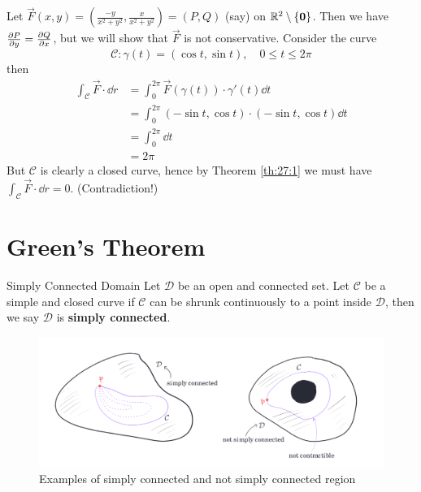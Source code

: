 \documentclass[../Analysis-3]{subfiles}
\begin{document}
\begin{Eg}{}{}
    Let $\vec{F}(x,y) = \left( \frac{-y}{x^2+y^2}, \frac{x}{x^2+y^2} \right) = (P,Q)$ (say) on $\mathbb{R}^2 \setminus \{\mathbf{0}\}$. Then we have $\pdv{P}{y} = \pdv{Q}{x}$, but we will show that $\vec{F}$ is not conservative. Consider the curve
    \[
        \mathcal{C} : \gamma(t) = ( \cos t, \sin t), \quad 0 \leq t \leq 2\pi
    \]
    then
    \begin{align*}
        \int_{\mathcal{C}} \vec{F} \cdot \dd r & = \int_0^{2\pi}  \vec{F}(\gamma(t))\cdot \gamma'(t)  \dd t       \\
                                               & = \int_0^{2\pi}  (-\sin t, \cos t) \cdot (-\sin t, \cos t) \dd t \\
                                               & = \int_0^{2\pi} \dd t                                            \\
                                               & = 2\pi
    \end{align*}
    But $\mathcal{C}$ is clearly a closed curve, hence by Theorem \ref{th:27:1} we must have $\int_{\mathcal{C}} \vec{F} \cdot \dd r = 0$. (Contradiction!)
\end{Eg}

\section{Green's Theorem}

\begin{Def}{Simply Connected Domain}{}
    Let $\mathcal{D}$ be an open and connected set. Let $\mathcal{C}$ be a simple and closed curve if $\mathcal{C}$ can be shrunk continuously to a point inside $\mathcal{D}$, then we say $\mathcal{D}$ is \textbf{simply connected}.
\end{Def}

\begin{figure}[h]
    \centering
    \includegraphics[width=\textwidth]{../figures/lec27.4.png}
    \caption{Examples of simply connected and not simply connected region}
    \label{fig4:27}
\end{figure}
\end{document}
